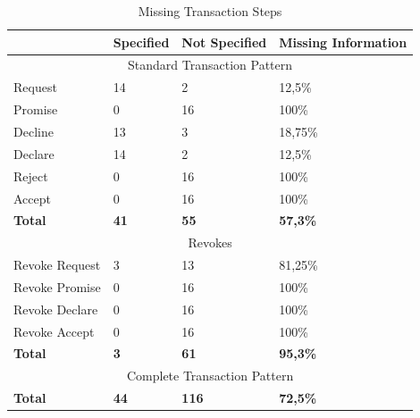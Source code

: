 \begin{table}[h]\centering
\caption{Missing Transaction Steps}
\label{tab:missing_transaction_steps}
\begin{tabular}{|l||l|l|l|}
\hline
                      & Specified    & Not Specified & Missing Information \\ \hline
\multicolumn{4}{|c|}{Standard Transaction Pattern}                        \\ \hline
Request               & 14           & 2            & 12,5\%             \\ \hline
Promise               & 0           & 16           & 100\%            \\ \hline
Decline               & 13          & 3           & 18,75\%             \\ \hline
Declare               & 14           & 2            & 12,5\%              \\ \hline
Reject                & 0            & 16           & 100\%             \\ \hline
Accept                & 0           & 16            & 100\%            \\ \hline
\textbf{Total}        & \textbf{41} & \textbf{55}  & \textbf{57,3\%}   \\ \hline
\multicolumn{4}{|c|}{Revokes}                                             \\ \hline
Revoke Request        & 3            & 13           & 81,25\%             \\ \hline
Revoke Promise        & 0            & 16           & 100\%             \\ \hline
Revoke Declare        & 0            & 16           & 100\%            \\ \hline
Revoke Accept         & 0            & 16           & 100\%             \\ \hline
\textbf{Total}        & \textbf{3}   & \textbf{61} & \textbf{95,3\%}    \\ \hline
\multicolumn{4}{|c|}{Complete Transaction Pattern}                        \\ \hline
\textbf{Total}        & \textbf{44} & \textbf{116} & \textbf{72,5\%}    \\ \hline
\end{tabular}

\end{table}